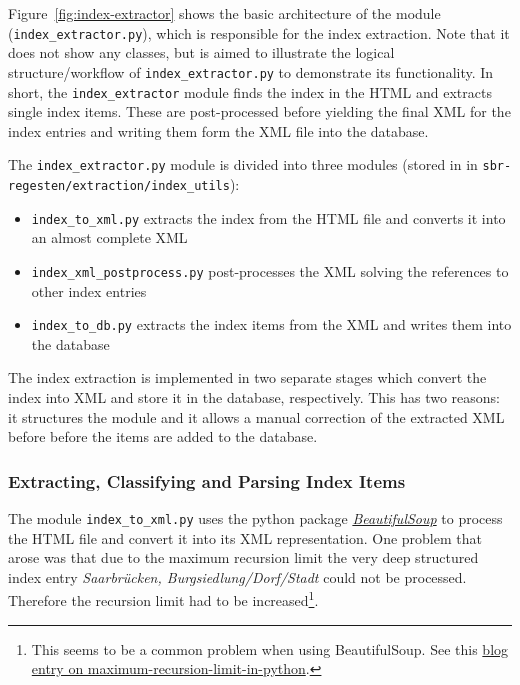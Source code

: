 Figure~\ref{fig:index-extractor} shows the basic architecture of the
module (\texttt{index\_extractor.py}), which is responsible for the
index extraction. Note that it does not show any classes, but is aimed
to illustrate the logical structure/workflow of
\texttt{index\_extractor.py} to demonstrate its functionality. In
short, the \texttt{index\_extractor} module finds the index in the
HTML and extracts single index items. These are post-processed before
yielding the final XML for the index entries and writing them form the
XML file into the database.

The \texttt{index\_extractor.py} module is divided into three modules
(stored in in \texttt{sbr-regesten/\-extraction/\-index\_utils}):

\begin{itemize}
\item \texttt{index\_to\_xml.py} extracts the index from the HTML file
  and converts it into an almost complete XML
\item \texttt{index\_xml\_postprocess.py} post-processes the XML
  solving the references to other index entries
\item \texttt{index\_to\_db.py} extracts the index items from the XML
  and writes them into the database
\end{itemize}

The index extraction is implemented in two separate stages which
convert the index into XML and store it in the database, respectively.
This has two reasons: it structures the module and it allows a manual
correction of the extracted XML before before the items are added to
the database.

\subsubsection{Extracting, Classifying and Parsing Index Items}
The module \texttt{index\_to\_xml.py} uses the python package
\href{http://www.crummy.com/software/BeautifulSoup/bs4/doc/}
{\textit{BeautifulSoup}} to process the HTML file and convert it into
its XML representation. One problem that arose was that due to the
maximum recursion limit the very deep structured index entry
\textit{Saarbrücken, Burgsiedlung/Dorf/Stadt} could not be processed.
Therefore the recursion limit had to be increased\footnote{This seems
  to be a common problem when using BeautifulSoup. See this
  \href{http://blog.pablohoffman.com/maximum-recursion-limit-in-python}{blog
    entry on maximum-recursion-limit-in-python}.}.

